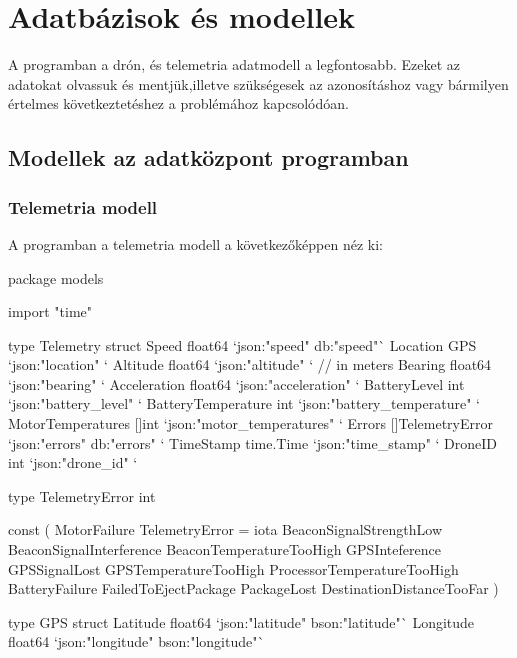 

\section{Adatbázisok és modellek}
A programban a drón, és telemetria adatmodell a legfontosabb.
Ezeket az adatokat olvassuk és mentjük,illetve szükségesek az azonosításhoz vagy bármilyen értelmes következtetéshez a problémához kapcsolódóan.

\subsection{Modellek az adatközpont programban}
\subsubsection{Telemetria modell}
A programban a telemetria modell a következőképpen néz ki:
\begin{python}
    package models

    import "time"

    type Telemetry struct {
        Speed              float64          `json:"speed" db:"speed"`
        Location           GPS              `json:"location" `
        Altitude           float64          `json:"altitude" ` // in meters
        Bearing            float64          `json:"bearing" `
        Acceleration       float64          `json:"acceleration" `
        BatteryLevel       int              `json:"battery_level" `
        BatteryTemperature int              `json:"battery_temperature" `
        MotorTemperatures  []int            `json:"motor_temperatures" `
        Errors             []TelemetryError `json:"errors" db:"errors" `
        TimeStamp          time.Time        `json:"time_stamp" `
        DroneID            int              `json:"drone_id" `
    }

    type TelemetryError int

    const (
        MotorFailure TelemetryError = iota
        BeaconSignalStrengthLow
        BeaconSignalInterference
        BeaconTemperatureTooHigh
        GPSInteference
        GPSSignalLost
        GPSTemperatureTooHigh
        ProcessorTemperatureTooHigh
        BatteryFailure
        FailedToEjectPackage
        PackageLost
        DestinationDistanceTooFar
    )

    type GPS struct {
        Latitude  float64 `json:"latitude" bson:"latitude"`
        Longitude float64 `json:"longitude" bson:"longitude"`
    }

\end{python}


